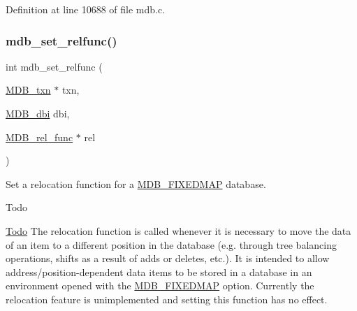 Definition at line 10688 of file mdb.\+c.

\mbox{\label{group__internal_ga697d82c7afe79f142207ad5adcdebfeb}} 
\subsubsection{\texorpdfstring{mdb\+\_\+set\+\_\+relfunc()}{mdb\_set\_relfunc()}}
{\footnotesize\ttfamily int mdb\+\_\+set\+\_\+relfunc (\begin{DoxyParamCaption}\item[{\mbox{\hyperlink{struct_m_d_b__txn}{M\+D\+B\+\_\+txn}} $\ast$}]{txn,  }\item[{\mbox{\hyperlink{group__mdb_gadbe68a06c448dfb62da16443d251a78b}{M\+D\+B\+\_\+dbi}}}]{dbi,  }\item[{\mbox{\hyperlink{group__mdb_ga311e8b7d73c5e7c03b625a894c5014cb}{M\+D\+B\+\_\+rel\+\_\+func}} $\ast$}]{rel }\end{DoxyParamCaption})}



Set a relocation function for a \mbox{\hyperlink{group__mdb__env_ga492952277c481bc4a6fa08ef71c29487}{M\+D\+B\+\_\+\+F\+I\+X\+E\+D\+M\+AP}} database. 

\begin{DoxyRefDesc}{Todo}
\item[\mbox{\hyperlink{todo__todo000002}{Todo}}]The relocation function is called whenever it is necessary to move the data of an item to a different position in the database (e.\+g. through tree balancing operations, shifts as a result of adds or deletes, etc.). It is intended to allow address/position-\/dependent data items to be stored in a database in an environment opened with the \mbox{\hyperlink{group__mdb__env_ga492952277c481bc4a6fa08ef71c29487}{M\+D\+B\+\_\+\+F\+I\+X\+E\+D\+M\+AP}} option. Currently the relocation feature is unimplemented and setting this function has no effect. \end{DoxyRefDesc}

